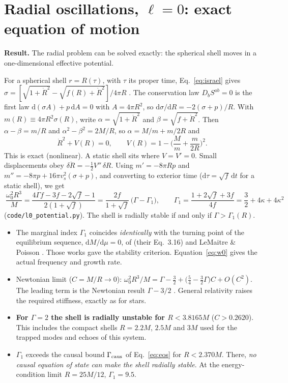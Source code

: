 \documentclass[10.5pt,a4paper]{article}
\newcommand{\sq}{\sqrt{f}}
\newcommand{\dd}{\mathrm{d}}
\newcommand{\idea}[1]{\par\smallskip\noindent\colorbox{idea!8}{\parbox{\dimexpr\linewidth-2\fboxsep}{\small\textbf{\color{idea}Result.} #1}}\par\smallskip}
\begin{document}
\section{Radial oscillations, $\ell=0$: exact equation of motion}
\idea{The radial problem can be solved exactly: the spherical shell moves in a one-dimensional effective potential.}

For a spherical shell $r=R(\tau)$, with $\tau$ its proper time, Eq.~\eqref{eq:israel} gives
$\sigma=[\sqrt{1+\dot R^2}-\sqrt{f(R)+\dot R^2}]/4\pi R$ \cite{IS84}. The conservation law $D_bS^{ab}=0$ is the first law
$\dd(\sigma A)+p\,\dd A=0$ with $A=4\pi R^2$, so $\dd\sigma/\dd R=-2(\sigma+p)/R$. With $m(R)\equiv4\pi R^2\sigma(R)$, write
$\alpha=\sqrt{1+\dot R^2}$ and $\beta=\sqrt{f+\dot R^2}$. Then $\alpha-\beta=m/R$ and $\alpha^2-\beta^2=2M/R$, so
$\alpha=M/m+m/2R$ and
\begin{equation}
\dot R^2+V(R)=0,\qquad V(R)=1-\Big(\frac Mm+\frac m{2R}\Big)^2 .
\label{eq:V}
\end{equation}
This is exact (nonlinear). A static shell sits where $V=V'=0$. Small displacements obey
$\delta\ddot R=-\tfrac12V''\,\delta R$. Using $m'=-8\pi Rp$ and $m''=-8\pi p+16\pi v_s^2(\sigma+p)$, and converting to
exterior time ($\dd\tau=\sq\,\dd t$ for a static shell), we get
\begin{equation}
\boxed{\ \frac{\omega_0^2R^3}{M}=\frac{4\Gamma f-3f-2\sq-1}{2(1+\sq)}=\frac{2f}{1+\sq}\,\big(\Gamma-\Gamma_1\big),\qquad
\Gamma_1=\frac{1+2\sq+3f}{4f}=\frac32+4\kappa+4\kappa^2\ }
\label{eq:w0}
\end{equation}
(\texttt{code/l0\_potential.py}). The shell is radially stable if and only if $\Gamma>\Gamma_1(R)$.
\begin{itemize}
\item The marginal index $\Gamma_1$ coincides \emph{identically} with the turning point of the equilibrium sequence,
$\dd M/\dd\mu=0$, of \cite{PSP26} (their Eq.~3.16) and LeMaitre \& Poisson \cite{LP19}. Those works gave the
stability criterion. Equation~\eqref{eq:w0} gives the actual frequency and growth rate.
\item Newtonian limit ($C=M/R\to0$): $\omega_0^2R^3/M=\Gamma-\tfrac32+\big(\tfrac54-\tfrac32\Gamma\big)C+O(C^2)$. The
leading term is the Newtonian result $\Gamma-3/2$ \cite{PSP26}. General relativity raises the required stiffness,
exactly as for stars.
\item \textbf{For $\Gamma=2$ the shell is radially unstable for $R<3.8165M$} ($C>0.2620$). This includes the compact
shells $R=2.2M$, $2.5M$ and $3M$ used for the trapped modes and echoes of this system.
\item $\Gamma_1$ exceeds the causal bound $\Gamma_{\rm caus}$ of Eq.~\eqref{eq:eos} for $R<2.370M$. There, \emph{no causal
equation of state can make the shell radially stable}. At the energy-condition limit $R=25M/12$, $\Gamma_1=9.5$.
\end{itemize}
\end{document}
